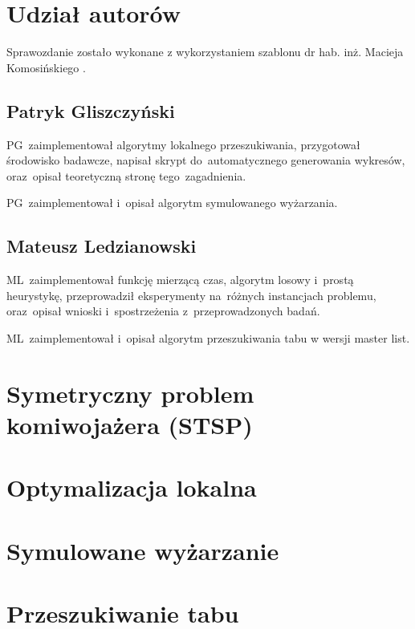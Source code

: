 \documentclass{article}
\begin{document}
\sloppy
{}



\section*{Udział autorów}

Sprawozdanie zostało wykonane z wykorzystaniem szablonu dr hab. inż. Macieja Komosińskiego \cite{MiOIB}.

\subsection*{Patryk Gliszczyński}
PG~zaimplementował algorytmy lokalnego przeszukiwania, przygotował środowisko badawcze, napisał skrypt do~automatycznego generowania wykresów, oraz~opisał teoretyczną stronę tego~zagadnienia.

{\color{part2} PG~zaimplementował i~opisał algorytm symulowanego wyżarzania.}

\subsection*{Mateusz Ledzianowski}
ML~zaimplementował funkcję mierzącą czas, algorytm losowy i~prostą heurystykę, przeprowadził eksperymenty na~różnych instancjach problemu, oraz~opisał wnioski i~spostrzeżenia z~przeprowadzonych badań.

{\color{part2} ML~zaimplementował i~opisał algorytm przeszukiwania tabu w wersji master list.}

\clearpage

\section{Symetryczny problem komiwojażera (STSP)}


\clearpage

\section{Optymalizacja lokalna}


\clearpage
{\color{part2}
\section{Symulowane wyżarzanie}


\clearpage

\section{Przeszukiwanie tabu}

}
\clearpage
\end{document}

